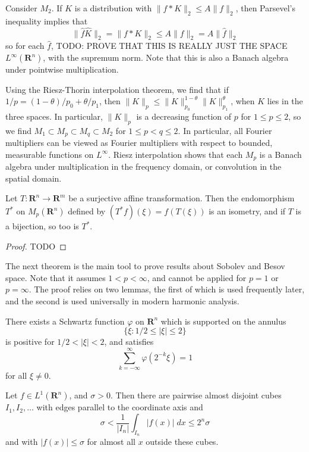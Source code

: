 \begin{example}
	Consider $M_2$. If $K$ is a distribution with $\| f * K \|_2 \leq A \| f \|_2$, then Parsevel's inequality implies that
	\[ \| \widehat{f} \widehat{K} \|_2 = \| f * K \|_2 \leq A \| f \|_2 = A \| \widehat{f} \|_2 \]
	so for each $\widehat{f}$, TODO: PROVE THAT THIS IS REALLY JUST THE SPACE $L^\infty(\mathbf{R}^n)$, with the supremum norm. Note that this is also a Banach algebra under pointwise multiplication.
\end{example}

Using the Riesz-Thorin interpolation theorem, we find that if $1/p = (1 - \theta)/p_0 + \theta/p_1$, then $\| K \|_p \leq \| K \|_{p_0}^{1 - \theta} \| K \|_{p_1}^\theta$, when $K$ lies in the three spaces. In particular, $\| K \|_p$ is a decreasing function of $p$ for $1 \leq p \leq 2$, so we find $M_1 \subset M_p \subset M_q \subset M_2$ for $1 \leq p < q \leq 2$. In particular, all Fourier multipliers can be viewed as Fourier multipliers with respect to bounded, measurable functions on $L^\infty$. Riesz interpolation shows that each $M_p$ is a Banach algebra under multiplication in the frequency domain, or convolution in the spatial domain.

\begin{theorem}
	Let $T: \mathbf{R}^n \to \mathbf{R}^m$ be a surjective affine transformation. Then the endomorphism $T^*$ on $M_p(\mathbf{R}^n)$ defined by $(T^* f)(\xi) = f(T(\xi))$ is an isometry, and if $T$ is a bijection, so too is $T^*$.
\end{theorem}
\begin{proof}
	TODO
\end{proof}

The next theorem is the main tool to prove results about Sobolev and Besov space. Note that it assumes $1 < p < \infty$, and cannot be applied for $p = 1$ or $p = \infty$. The proof relies on two lemmas, the first of which is used frequently later, and the second is used universally in modern harmonic analysis.

\begin{lemma}
	There exists a Schwartz function $\varphi$ on $\mathbf{R}^n$ which is supported on the annulus
	\[ \{ \xi: 1/2 \leq |\xi| \leq 2 \} \]
	is positive for $1/2 < |\xi| < 2$, and satisfies
	\[ \sum_{k = -\infty}^\infty \varphi(2^{-k} \xi) = 1 \]
	for all $\xi \neq 0$.
\end{lemma}

\begin{lemma}
	Let $f \in L^1(\mathbf{R}^n)$, and $\sigma > 0$. Then there are pairwise almost disjoint cubes $I_1, I_2, \dots$ with edges parallel to the coordinate axis and
	\[ \sigma < \frac{1}{|I_n|} \int_{I_n} |f(x)|\; dx \leq 2^n \sigma \]
	and with $|f(x)| \leq \sigma$ for almost all $x$ outside these cubes.
\end{lemma}

